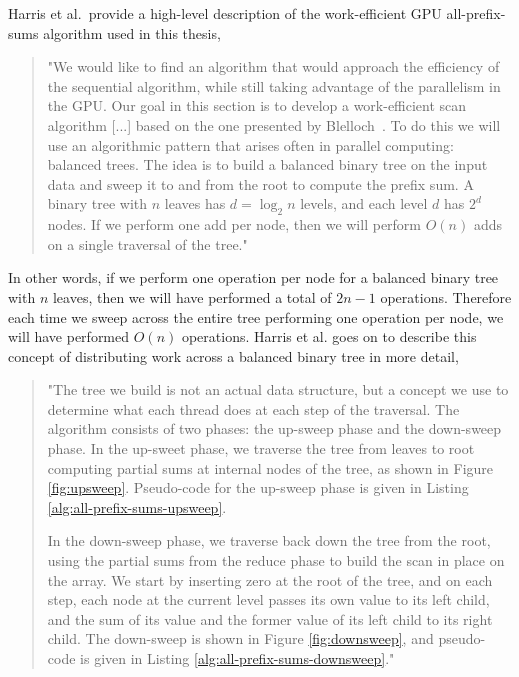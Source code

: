 Harris et al.\ provide a high-level description of the work-efficient GPU all-prefix-sums algorithm used in this thesis,
\begin{quotation}
"We would like to find an algorithm that would approach the efficiency of the sequential algorithm, while still taking advantage of the parallelism in the GPU. Our goal in this section is to develop a work-efficient scan algorithm [...] based on the one presented by Blelloch~\cite{Blelloch-1993}. To do this we will use an algorithmic pattern that arises often in parallel computing: balanced trees. The idea is to build a balanced binary tree on the input data and sweep it to and from the root to compute the prefix sum. A binary tree with $n$ leaves has $d = \log_2n$ levels, and each level $d$ has $2^d$ nodes. If we perform one add per node, then we will perform $O(n)$ adds on a single traversal of the tree."
\end{quotation}

In other words, if we perform one operation per node for a balanced binary tree with $n$ leaves, then we will have performed a total of $2n - 1$ operations. Therefore each time we sweep across the entire tree performing one operation per node, we will have performed $O(n)$ operations.
Harris et al. goes on to describe this concept of distributing work across a balanced binary tree in more detail,
\begin{quotation}
"The tree we build is not an actual data structure, but a concept we use to determine what each thread does at each step of the traversal. The algorithm consists of two phases: the up-sweep phase and the down-sweep phase. In the up-sweet phase, we traverse the tree from leaves to root computing partial sums at internal nodes of the tree, as shown in Figure \ref{fig:upsweep}. Pseudo-code for the up-sweep phase is given in Listing \ref{alg:all-prefix-sums-upsweep}.

In the down-sweep phase, we traverse back down the tree from the root, using the partial sums from the reduce phase to build the scan in place on the array. We start by inserting zero at the root of the tree, and on each step, each node at the current level passes its own value to its left child, and the sum of its value and the former value of its left child to its right child. The down-sweep is shown in Figure \ref{fig:downsweep}, and pseudo-code is given in Listing \ref{alg:all-prefix-sums-downsweep}."~\cite{Harris-2007}
\end{quotation}

